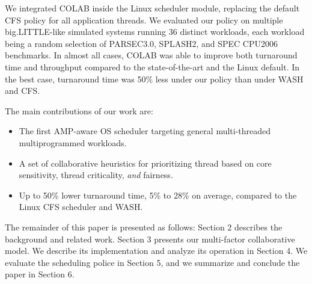 We integrated COLAB inside the Linux scheduler module, replacing the default CFS policy for all application threads. We evaluated our policy on multiple big.LITTLE-like simulated systems running 36 distinct workloads, each workload being a random selection of PARSEC3.0, SPLASH2, and SPEC CPU2006 benchmarks. In almost all cases, COLAB was able to improve both turnaround time and throughput compared to the state-of-the-art and the Linux default. In the best case, turnaround time was 50\% less under our policy than under WASH and CFS.


The main contributions of our work are:
\begin{itemize}
\item The first AMP-aware OS scheduler targeting general multi-threaded multiprogrammed workloads.
\item A set of collaborative heuristics for prioritizing thread based on core sensitivity, thread criticality, \emph{and} fairness.
\item Up to 50\% lower turnaround time, 5\% to 28\% on average, compared to the Linux CFS scheduler and WASH.
\end{itemize}

The remainder of this paper is presented as follows: Section 2 describes the background and related work. Section 3 presents our multi-factor collaborative model. We describe its implementation and analyze its operation in Section 4. We evaluate the scheduling police in Section 5, and we summarize and conclude the paper in Section 6.  